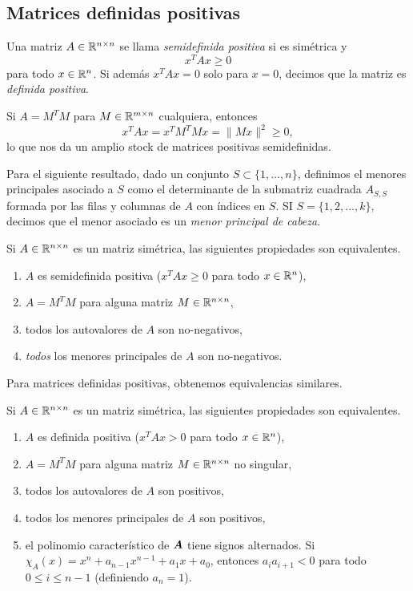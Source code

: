 \subsection{Matrices definidas positivas}

Una matriz $A \in \mathbb{R}^{n \times n}$ se llama \emph{semidefinida positiva} si es simétrica y
$$
x^T A x  \ge 0
$$
para todo $x \in \mathbb{R}^n$. Si además $x^T A x = 0$ solo para $x = 0$, decimos que la matriz es \emph{definida positiva}.

Si $A = M^T M$ para $M \in \mathbb{R}^{m \times n}$ cualquiera, entonces
$$
x^T A x = x^T M^T M x = \| Mx \|^2 \ge 0,
$$
lo que nos da un amplio stock de matrices positivas semidefinidas.

Para el siguiente resultado, dado un conjunto $S \subset \{1, \dots, n\}$, definimos el menores principales asociado a $S$ como el determinante de la submatriz cuadrada  $A_{S,S}$ formada por las filas y columnas de $A$ con índices en $S$.
SI $S = \{1, 2, \dots, k\}$, decimos que el menor asociado es un \emph{menor principal de cabeza}.

\begin{theorem}
  Si $A \in \mathbb{R}^{n\times n}$ es un matriz simétrica, las siguientes propiedades son equivalentes.
  \begin{enumerate}
  \item $A$ es semidefinida positiva ($x^T A x \ge 0$ para todo $x \in \mathbb{R}^n$),
  \item $A = M^T M$ para alguna matriz $M \in \mathbb{R}^{n \times n}$,
  \item todos los autovalores de $A$ son no-negativos,
  \item \emph{todos} los menores principales de $A$ son no-negativos.
  \end{enumerate}
\end{theorem}

Para matrices definidas positivas, obtenemos equivalencias similares.

\begin{theorem}
  Si $A \in \mathbb{R}^{n\times n}$ es un matriz simétrica, las siguientes propiedades son equivalentes.
  \begin{enumerate}
  \item $A$ es definida positiva ($x^T A x > 0$ para todo $x \in \mathbb{R}^n$),
  \item \label{MTM} $A = M^T M$ para alguna matriz $M \in \mathbb{R}^{n \times n}$ no singular,
  \item todos los autovalores de $A$ son positivos,
  \item \label{menoresprincipales} todos los menores principales de $A$ son positivos,
  \item el polinomio característico de $\bm{A}$ tiene signos alternados. Si $\chi_A(x) = x^n + a_{n-1} x^{n-1} + a_1 x + a_0$, entonces $a_i a_{i+1} < 0$ para todo $0 \le i \le {n-1}$ (definiendo $a_n = 1$).
  \end{enumerate}
\end{theorem}


